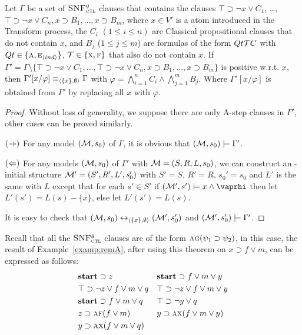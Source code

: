 \documentclass[letterpaper]{article}
\begin{document}
\begin{theorem} \label{thm:Aclm}
  Let $\Gamma$ be a set of ${\textsc{SNF}_{\textsc{ctl}}^g}$ clauses that contains the clauses $\top \supset \neg x \vee C_1$, \dots, $\top \supset \neg x \vee C_n, x \supset B_1, \dots, x \supset B_m$, where $x \in V'$ is a atom introduced in the Transform process, the $C_i$ $(1 \leq i \leq n)$ are Classical propositional clauses that do not contain $x$, and $B_j$ ($1 \leq j \leq m$) are formulas of the form $Qt {\cal T} C$ with $Qt \in \{\textsc{a}, \textsc{e}_{{\langle{ind}\rangle}}\}$, ${\cal T}\in \{\textsc{x}, \textsc{f}\}$ that also do not contain $x$. If $\Gamma'= \Gamma \setminus \{\top \supset \neg x \vee C_1, \dots, \top \supset \neg x \vee C_n, x \supset B_1, \dots, x \supset B_m\}$ is positive w.r.t. $x$, then $\Gamma'[x/\varphi] \equiv_{{\langle{\{x\}, \emptyset}\rangle}} \Gamma$ with $\varphi = \bigwedge_{i=1}^n C_i \wedge \bigwedge_{j=1}^m B_j$. Where $\Gamma'[x/\varphi]$ is obtained from $\Gamma'$ by replacing all $x$ with $\varphi$.
\end{theorem}
\begin{proof}
Without loss of generality, we suppose there are only A-step clauses in $\Gamma'$, other cases can be proved similarly. 

$(\Rightarrow)$ For any model $({\cal M}, s_0)$ of $\Gamma$, it is obvious that $({\cal M}, s_0) \models \Gamma'$.

$(\Leftarrow)$ For any models $({\cal M}, s_0)$ of $\Gamma'$ with ${\cal M} = (S, R, L, s_0)$, we can construct an \Ind-initial structure ${\cal M}'=(S', R', L', s_0')$ with $S'=S$, $R'=R$, $s_0'= s_0$ and $L'$ is the same with $L$ except that for each $s'\in S'$ if $(\Hm', s') \models x \wedge \vaprhi$ then let $L'(s') = L(s) - \{x\}$, else let $L'(s') = L(s)$.

It is easy to check that $({\cal M},s_0) \leftrightarrow_{{\langle{\{x\}, \emptyset}\rangle}} ({\cal M}', s_0')$ and $({\cal M}',s_0') \models \Gamma'$.
\end{proof}

Recall that all the ${\textsc{SNF}_{\textsc{ctl}}^g}$ clauses are of the form $\textsc{a}\textsc{g}(\psi_1 \supset \psi_2)$, in this case, the result of Example~\ref{examp:remA}, after using this theorem on $x \supset f \vee m$, can be expressed as follows:
\begin{align*}
& \textbf{start}\supset z &&  \textbf{start} \supset f \vee m \vee y \\
&  \top \supset \neg z \vee f \vee m \vee q &&  \top \supset \neg z \vee f \vee m \vee y \\
&  \textbf{start} \supset f\vee m \vee q &&  \top \supset \neg y \vee q\\
&  z \supset \textsc{a} \textsc{f} (f \vee m) &&   y \supset \textsc{a} \textsc{x}(f \vee m \vee y) \\
& y \supset \textsc{a}\textsc{x}(f \vee m\vee q) &&  \\
\end{align*}
\end{document}
